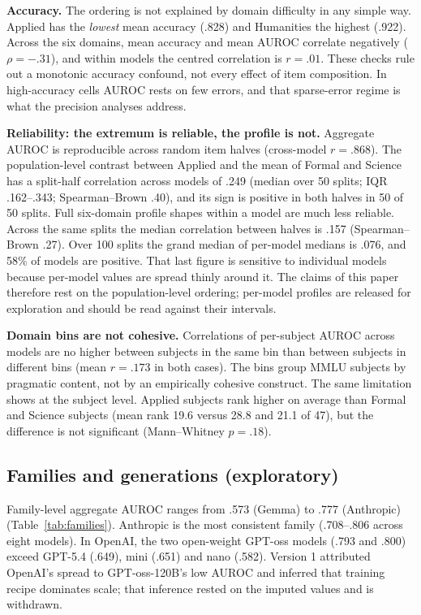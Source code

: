 \textbf{Accuracy.} The ordering is not explained by domain difficulty in any simple way. Applied has the \emph{lowest} mean accuracy (.828) and Humanities the highest (.922). Across the six domains, mean accuracy and mean AUROC correlate negatively ($\rho = -.31$), and within models the centred correlation is $r = .01$. These checks rule out a monotonic accuracy confound, not every effect of item composition. In high-accuracy cells AUROC rests on few errors, and that sparse-error regime is what the precision analyses address.

\textbf{Reliability: the extremum is reliable, the profile is not.} Aggregate AUROC is reproducible across random item halves (cross-model $r = .868$). The population-level contrast between Applied and the mean of Formal and Science has a split-half correlation across models of .249 (median over 50 splits; IQR .162--.343; Spearman--Brown .40), and its sign is positive in both halves in 50 of 50 splits. Full six-domain profile shapes within a model are much less reliable. Across the same splits the median correlation between halves is .157 (Spearman--Brown .27). Over 100 splits the grand median of per-model medians is .076, and 58\% of models are positive. That last figure is sensitive to individual models because per-model values are spread thinly around it. The claims of this paper therefore rest on the population-level ordering; per-model profiles are released for exploration and should be read against their intervals.

\textbf{Domain bins are not cohesive.} Correlations of per-subject AUROC across models are no higher between subjects in the same bin than between subjects in different bins (mean $r = .173$ in both cases). The bins group MMLU subjects by pragmatic content, not by an empirically cohesive construct. The same limitation shows at the subject level. Applied subjects rank higher on average than Formal and Science subjects (mean rank 19.6 versus 28.8 and 21.1 of 47), but the difference is not significant (Mann--Whitney $p = .18$).

\subsection{Families and generations (exploratory)}

Family-level aggregate AUROC ranges from .573 (Gemma) to .777 (Anthropic) (Table~\ref{tab:families}). Anthropic is the most consistent family (.708--.806 across eight models). In OpenAI, the two open-weight GPT-oss models (.793 and .800) exceed GPT-5.4 (.649), mini (.651) and nano (.582). Version 1 attributed OpenAI's spread to GPT-oss-120B's low AUROC and inferred that training recipe dominates scale; that inference rested on the imputed values and is withdrawn.

